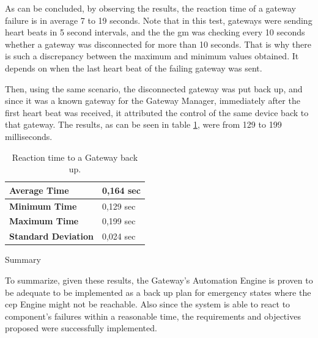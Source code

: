As can be concluded, by observing the results, the reaction time of a gateway failure is in average 7 to 19 seconds. Note that in this test, gateways were sending heart beats in 5 second intervals, and the the \ac{gm} was checking every 10 seconds whether a gateway was disconnected for more than 10 seconds. That is why there is such a discrepancy between the maximum and minimum values obtained. It depends on when the last heart beat of the failing gateway was sent.

Then, using the same scenario, the disconnected gateway was put back up, and since it was a known gateway for the Gateway Manager, immediately after the first heart beat was received, it attributed the control of the same device back to that gateway. The results, as can be seen in table \ref{gwup}, were from 129 to 199 milliseconds.

\begin{table}[H]
	
	\begin{tabular}{|l|l|}
		\hline
		\textbf{Average Time}       & 0,164 sec \\ \hline
		\textbf{Minimum Time}       & 0,129 sec \\ \hline
		\textbf{Maximum Time}       & 0,199 sec \\ \hline
		\textbf{Standard Deviation} & 0,024 sec \\ \hline
	\end{tabular}
	\centering
	\caption{Reaction time to a Gateway back up.}
	\label{gwup}
\end{table}


\begin{Paragraph}{Summary}
	
	
	
To summarize, given these results, the Gateway's Automation Engine is proven to be adequate to be implemented as a back up plan for emergency states where the \ac{cep} Engine might not be reachable. Also since the system is able to react to component's failures within a reasonable time, the requirements and objectives proposed were successfully implemented.  

\end{Paragraph}
